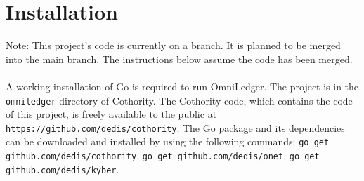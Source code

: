 \section{Installation}
Note: This project's code is currently on a branch. It is planned to be merged into the main branch. The instructions below assume the code has been merged. \\\\
A working installation of Go is required to run OmniLedger. The project is in the \texttt{omniledger} directory of Cothority. The Cothority code, which contains the code of this project, is freely available to the public at \texttt{https://github.com/dedis/cothority}. The Go package and its dependencies can be downloaded and installed by using the following commands: \texttt{go get github.com/dedis/cothority}, \texttt{go get github.com/dedis/onet}, \texttt{go get github.com/dedis/kyber}. \\\\